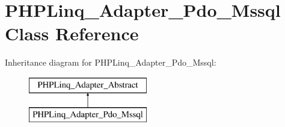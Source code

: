 \hypertarget{class_p_h_p_linq___adapter___pdo___mssql}{\section{\-P\-H\-P\-Linq\-\_\-\-Adapter\-\_\-\-Pdo\-\_\-\-Mssql \-Class \-Reference}
\label{class_p_h_p_linq___adapter___pdo___mssql}
}
\-Inheritance diagram for \-P\-H\-P\-Linq\-\_\-\-Adapter\-\_\-\-Pdo\-\_\-\-Mssql\-:\begin{figure}[H]
\begin{center}
\leavevmode
\includegraphics[height=2.000000cm]{class_p_h_p_linq___adapter___pdo___mssql}
\end{center}
\end{figure}
